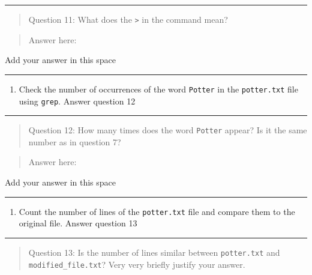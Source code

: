 \documentclass[
]{book}
\providecommand{\tightlist}{%
  \setlength{\itemsep}{0pt}\setlength{\parskip}{0pt}}
\begin{document}
\begin{center}\rule{0.5\linewidth}{0.5pt}\end{center}

\begin{quote}
Question 11: What does the \texttt{\textgreater{}} in the command mean?
\end{quote}

\begin{quote}
Answer here:
\end{quote}

{Add your answer in this space}

\begin{center}\rule{0.5\linewidth}{0.5pt}\end{center}

\begin{enumerate}
\def\labelenumi{\arabic{enumi}.}
\setcounter{enumi}{1}
\tightlist
\item
  Check the number of occurrences of the word \texttt{Potter} in the \texttt{potter.txt} file using \texttt{grep}. Answer question 12
\end{enumerate}

\begin{center}\rule{0.5\linewidth}{0.5pt}\end{center}

\begin{quote}
Question 12: How many times does the word \texttt{Potter} appear? Is it the same number as in question 7?
\end{quote}

\begin{quote}
Answer here:
\end{quote}

{Add your answer in this space}

\begin{center}\rule{0.5\linewidth}{0.5pt}\end{center}

\begin{enumerate}
\def\labelenumi{\arabic{enumi}.}
\setcounter{enumi}{2}
\tightlist
\item
  Count the number of lines of the \texttt{potter.txt} file and compare them to the original file. Answer question 13
\end{enumerate}

\begin{center}\rule{0.5\linewidth}{0.5pt}\end{center}

\begin{quote}
Question 13: Is the number of lines similar between \texttt{potter.txt} and \texttt{modified\_file.txt}? Very very briefly justify your answer.
\end{quote}
\end{document}
